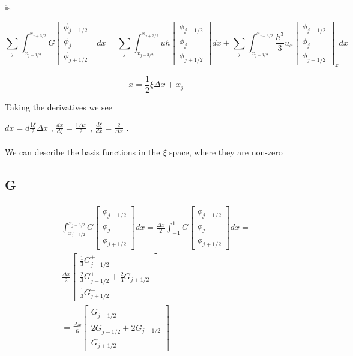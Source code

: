 \documentclass[12pt]{article}
\begin{document}
is 

\[\sum_{j}\int_{x_{j-3/2}}^{x_{j+3/2}}G\left[\begin{array}{c}\phi_{j-1/2} \\\phi_{j}\\\phi_{j+1/2} \end{array}\right]  dx = \sum_{j}\int_{x_{j-3/2}}^{x_{j+3/2}} uh \left[\begin{array}{c}\phi_{j-1/2} \\\phi_{j}\\\phi_{j+1/2} \end{array}\right] dx + \sum_{j}\int_{x_{j-3/2}}^{x_{j+3/2}}\frac{h^3}{3}u_{x}\left[\begin{array}{c}\phi_{j-1/2} \\\phi_{j}\\\phi_{j+1/2} \end{array}\right]_xdx\]


$$x = \frac{1}{2}\xi\Delta x + x_{j}$$

Taking the derivatives we see


$dx = d\frac{1\xi}{2}\Delta x$ , $\frac{dx}{d\xi} = \frac{1\Delta x}{2}$ , $\frac{d\xi}{dx} = \frac{2}{\Delta x}$ . \\ \\ We can describe the basis functions in the $\xi$ space, where they are non-zero

\subsection{G}
\begin{multline*}
\int_{x_{j-3/2}}^{x_{j+3/2}}G\left[\begin{array}{c}\phi_{j-1/2} \\\phi_{j}\\\phi_{j+1/2} \end{array}\right]  dx =  \frac{\Delta x}{2}\int_{-1}^{1}G\left[\begin{array}{c}\phi_{j-1/2} \\\phi_{j}\\\phi_{j+1/2} \end{array}\right]  dx = \\
\frac{\Delta x}{2} \left[\begin{array}{c} \frac{1}{3} G^+_{j - 1/2} \\ \frac{2}{3} G^+_{j - 1/2} + \frac{2}{3} G^-_{j + 1/2} \\ \frac{1}{3} G^-_{j + 1/2} \end{array}\right] \\ =  \frac{\Delta x}{6} \left[\begin{array}{c}  G^+_{j - 1/2} \\ 2 G^+_{j - 1/2} + 2 G^-_{j + 1/2} \\ G^-_{j + 1/2} \end{array}\right] 
\end{multline*}
\end{document}
